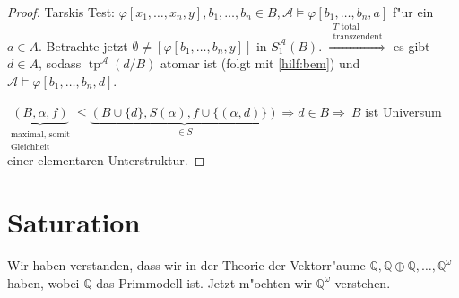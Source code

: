 \documentclass[a4paper,12pt,numbers=noenddot,parskip=full]{scrartcl}
\newcommand{\setQ}{\mathbb{Q}}
\newcommand{\scrA}{\mathcal{A}}
\DeclareMathOperator{\typ}{tp}
\theoremstyle{dotless}
\begin{document}
\begin{proof}
	Tarskis Test: $\varphi[x_1, \dots, x_n, y], b_1, \dots, b_n \in B, \scrA \models \varphi[b_1, \dots, b_n, a]$ f"ur ein $a \in A$. Betrachte jetzt $\emptyset \neq [\varphi[b_1, \dots, b_n, y]]$ in $S_1^\scrA(B)$. $\overset{\substack{T\text{ total}\\\text{transzendent}}}{\Longrightarrow}$ es gibt $d \in A$, sodass $\typ^\scrA(d/B)$ atomar ist (folgt mit \eqref{hilf:bem}) und $\scrA \models \varphi[b_1, \dots, b_n, d]$.
	
	$\underbrace{(B, \alpha, f)}_{\substack{\text{maximal, somit}\\\text{Gleichheit}}} \leq \underbrace{(B \cup \{d\}, S(\alpha), f \cup \{(\alpha, d)\})}_{\in S} \Longrightarrow d \in B \Longrightarrow~ B$ ist Universum einer elementaren Unterstruktur.
\end{proof}

\section{Saturation}
Wir haben verstanden, dass wir in der Theorie der Vektorr"aume $\setQ, \setQ \oplus \setQ, \dots , \setQ^\omega$ haben, wobei $\setQ$ das Primmodell ist. Jetzt m"ochten wir $\setQ^\omega$ verstehen.
\end{document}
